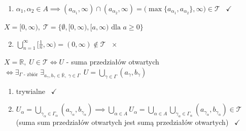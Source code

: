 \documentclass[a4paper,12pt]{article}
\begin{document}
\begin{podpunkty}
\begin{enumerate}[label=\roman*), leftmargin=1.9em, itemsep=0.2em, topsep=0.2em, parsep=0pt, partopsep=0pt]
        \smallskip
        \((*)\):
        \begin{itemize}
            \item \(\subseteq\): \, \(x \in \bigcup_{\alpha \in A} (a_\alpha, \infty) \iff \exists_{\alpha_0 \in A} \;\, x \in (a_{\alpha_0}, \infty) \implies x \in \big(\inf_{\alpha \in A} a_\alpha, \infty\big)\), \, bo \(\forall_{\alpha \in A} \;\, a_\alpha \geq \inf_{\alpha \in A} a_\alpha \implies (a_\alpha, \infty) \subseteq \big(\inf_{\alpha \in A} a_\alpha, \infty\big)\)
            \item \(\supseteq\): \, \(x \in \big(\inf_{\alpha \in A} a_\alpha, \infty\big) \overset{\text{z def kresu dolnego}}{\implies} \exists_{\alpha_0 \in A} \;\, a_{\alpha_0} < x \implies x \in (a_{\alpha_0}, \infty) \implies x \in \bigcup_{\alpha \in A} (a_\alpha, \infty)\)
        \end{itemize}
        \item \(\alpha_1, \alpha_2 \in A \implies (a_{\alpha_1}, \infty) \cap (a_{\alpha_2}, \infty) = \big(\max\{a_{\alpha_1}, a_{\alpha_2}\}, \infty\big) \in \mathcal{T}\) \, \(\checkmark\)
    \end{enumerate}
    \item \(X = [0, \infty), \; \mathcal{T} = \{\emptyset, [0, \infty), [a, \infty) \text{ dla } a \geq 0\}\)
    \begin{enumerate}[label=\roman*), leftmargin=1.9em, itemsep=0.2em, topsep=0.2em, parsep=0pt, partopsep=0pt]
        \setcounter{enumi}{1}
        \item \(\bigcup_{n=1}^{\infty} \big[\frac{1}{n}, \infty\big) = (0, \infty) \notin \mathcal{T}\) \, \(\times\)
    \end{enumerate}
    \item \(X = \mathbb{R}, \; U \in \mathcal{T} \iff U\) - suma przedziałów otwartych \(\iff \exists_{\Gamma \text{ - zbiór}} \; \exists_{a_\gamma, b_\gamma \in \overline{\mathbb{R}}, \; \gamma \in \Gamma} \;\, U = \bigcup_{\gamma \in \Gamma} (a_\gamma, b_\gamma)\)
    \begin{enumerate}[label=\roman*), leftmargin=1.9em, itemsep=0.2em, topsep=0.2em, parsep=0pt, partopsep=0pt]
        \item trywialne \, \(\checkmark\)
        \item \(U_\alpha = \bigcup_{\gamma_\alpha \in \Gamma_\alpha} (a_{\gamma_\alpha}, b_{\gamma_\alpha}) \implies \bigcup_{\alpha \in A} U_\alpha = \bigcup_{\alpha \in A} \bigcup_{\gamma_\alpha \in \Gamma_\alpha} (a_{\gamma_\alpha}, b_{\gamma_\alpha}) \in \mathcal{T}\) \, (suma sum przedziałów otwartych jest sumą przedziałów otwartych) \, \(\checkmark\)

\end{enumerate}
\end{podpunkty}
\end{document}
